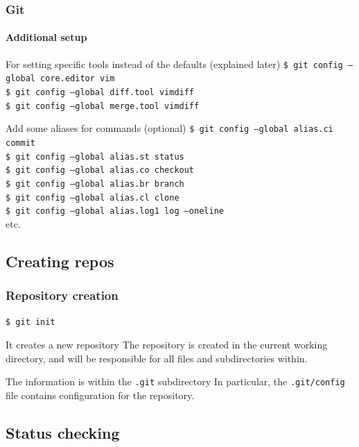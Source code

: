 \begin{frame}
\frametitle{Git}
\framesubtitle{Additional setup}

\begin{block}{For setting specific tools instead of the defaults (explained later)}
\texttt{\$ git config ---global core.editor vim} \\
\texttt{\$ git config ---global diff.tool vimdiff}  \\
\texttt{\$ git config ---global merge.tool vimdiff}
\end{block}

\pause
\begin{block}{Add some aliases for commands (optional)}
\texttt{\$ git config ---global alias.ci commit} \\
\texttt{\$ git config ---global alias.st status} \\
\texttt{\$ git config ---global alias.co checkout} \\
\texttt{\$ git config ---global alias.br branch} \\
\texttt{\$ git config ---global alias.cl clone} \\
\texttt{\$ git config ---global alias.log1 log ---oneline} \\
etc.
\end{block}
\end{frame}

\subsection{Creating repos}

\begin{frame}
\frametitle{Repository creation}

\texttt{\$ git init}

\bigskip
\begin{block}{It creates a new repository}
The repository is created in the current working directory, and will be responsible for all files and subdirectories within.
\end{block}
\begin{block}{The information is within the \texttt{.git} subdirectory}
In particular, the \texttt{.git/config} file contains configuration for the repository.
\end{block}
\end{frame}

\subsection{Status checking}

